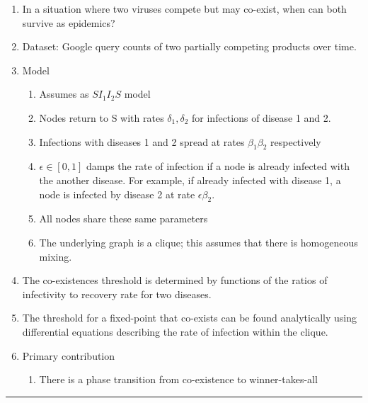 \documentclass[11pt]{article}
\begin{document}
\begin{enumerate}
    
    \item In a situation where two viruses compete but may co-exist, when can both survive as epidemics?
    
    \item Dataset: Google query counts of two partially competing products over time.
    
    \item Model \begin{enumerate}
        \item Assumes as $SI_{1}I_{2}S$ model
        
        \item Nodes return to S with rates $\delta_{1},\delta_{2}$ for infections of disease 1 and 2.
        
        \item Infections with diseases 1 and 2 spread at rates $\beta_{1}\beta_{2}$ respectively
        
        \item $\epsilon \in [0,1]$ damps the rate of infection if a node is already infected with the another disease. For example, if already infected with disease 1, a node is infected by disease 2 at rate $\epsilon\beta_{2}$.
        
        \item All nodes share these same parameters
        
        \item The underlying graph is a clique; this assumes 
        that there is homogeneous mixing. 
         
        
    \end{enumerate}
    
    \item The co-existences threshold is determined by functions of the ratios of infectivity to recovery rate for two diseases.
    
    
    \item The threshold for a fixed-point that co-exists can be 
    found analytically using differential equations describing the rate of infection within the clique.
    
    \item Primary contribution \begin{enumerate}
        \item There is a phase transition from co-existence to winner-takes-all
    \end{enumerate}
    
\end{enumerate}
\noindent
\rule{\textwidth}{0.01in}
\end{document}
